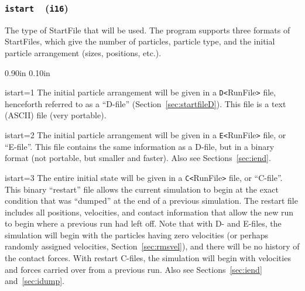 \documentclass[letterpaper,11pt]{article}
\newcommand{\Var}[2]{\texttt{#1}\ \  (\texttt{#2})}
\newlength{\Labelwidth}
\newcommand{\Entrylabel}[1]{\makebox[\Labelwidth][r]{\texttt{#1}}}
\newenvironment{Options}
{\begin{list}{}{%
\renewcommand{\makelabel}{\Entrylabel}%
\setlength{\leftmargin} {0.90in}%
\setlength{\rightmargin}{0.00in}%
\setlength{\labelsep}   {0.10in}%
\setlength{\labelwidth} {\Labelwidth}%
}}
{\end{list}}
\begin{document}
\subsubsection[\texttt{istart}]{\Var{istart}{i16}}\label{sec:istart}
The type of \textsf{StartFile} that will be used.
The program supports three formats
of \textsf{StartFile}s, which give
the number of particles, particle type,
and the initial particle arrangement (sizes, positions, etc.).
\begin{Options}
\item[istart=1]
The initial particle arrangement will be given in a 
\mbox{\texttt{D<}\textsf{RunFile}\texttt{>}} file,
henceforth referred to as a ``D-file'' (Section~\ref{sec:startfileD}).
This file is a text (ASCII) file (very portable).
\item[istart=2]
The initial particle arrangement will be given in a
\mbox{\texttt{E<}\textsf{RunFile}\texttt{>}} file,
or ``E-file''.
This file contains the same information
as a D-file, but in a binary format (not portable, but smaller and
faster).
Also see Sections~\ref{sec:iend}.
\item[istart=3]
The entire initial state will be given in a 
\mbox{\texttt{C<}\textsf{RunFile}\texttt{>}} file,
or ``C-file''.
This binary ``restart'' file allows the current simulation
to begin at the exact condition
that was ``dumped'' at the end of a previous simulation.  
The restart file includes all positions,
velocities, and contact information that allow the new run to begin
where a previous run had left off.
Note that with D- and E-files, the simulation will begin
with the particles having zero velocities
(or perhaps randomly assigned
velocities, Section~\ref{sec:rmsvel}),
and there will be no history of the contact
forces.
With restart C-files, the simulation will begin with velocities
and forces carried over from a previous run.
Also see Sections~\ref{sec:iend} and~\ref{sec:idump}.
\end{Options}
\end{document}

